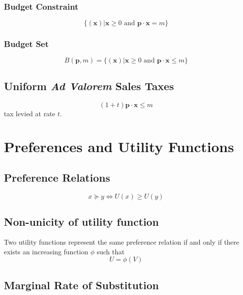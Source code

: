 \documentclass[a4paper] {scrartcl}
\begin{document}
\subsubsection{Budget Constraint}
\begin{equation}
	\{(\mathbf{x})|\mathbf{x}\geq0 \text{ and } \mathbf{p}\cdot \mathbf{x}=m\}
\end{equation}

\subsubsection{Budget Set}
\begin{equation}
	B(\mathbf{p}, m)=\{(\mathbf{x})|\mathbf{x}\geq0 \text{ and } \mathbf{p}\cdot \mathbf{x}\leq m\}
\end{equation}


\subsection{Uniform \emph{Ad Valorem} Sales Taxes}
\begin{equation}
	(1+t)\mathbf{p}\cdot \mathbf{x}\leq m
\end{equation}
tax levied at rate $t$.

\section{Preferences and Utility Functions}

\subsection{Preference Relations}
\begin{equation}
	x\succeq y \Leftrightarrow U(x)\geq U(y)
\end{equation}

\subsection{Non-unicity of utility function}
Two utility functions represent the same preference relation if and only if there exists an increasing function $\phi$ such that
\begin{equation}
	U = \phi(V)
\end{equation}


\subsection{Marginal Rate of Substitution}
\end{document}
